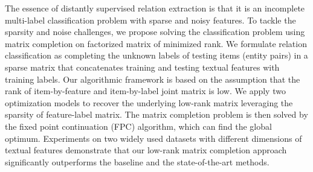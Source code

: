 The essence of distantly supervised relation extraction is that it is an incomplete multi-label classification problem with sparse and noisy features. To tackle the sparsity and noise challenges, we propose solving the classification problem using matrix completion on factorized matrix of minimized rank. We formulate relation classification as completing the unknown labels of testing items (entity pairs) in a sparse matrix that concatenates training and testing textual features with training labels. Our algorithmic framework is based on the assumption that the rank of item-by-feature and item-by-label joint matrix is low. We apply two optimization models to recover the underlying low-rank matrix leveraging the sparsity of feature-label matrix. The matrix completion problem is then solved by the fixed point continuation (FPC) algorithm, which can find the global optimum. Experiments on two widely used datasets with different dimensions of textual features demonstrate that our low-rank matrix completion approach significantly outperforms the baseline and the state-of-the-art methods.
